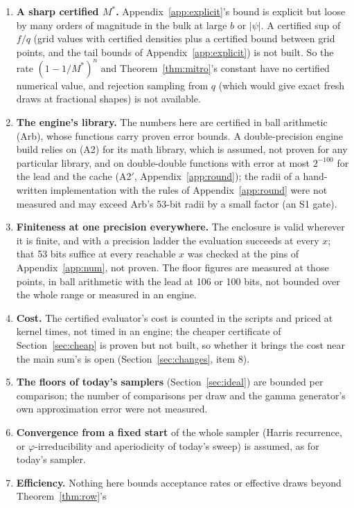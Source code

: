 \begin{enumerate}
\item \textbf{A sharp certified $M^*$.} Appendix~\ref{app:explicit}'s bound is explicit but loose by many orders of
magnitude in the bulk at large $b$ or $|\psi|$. A certified sup of $f/q$ (grid values with certified densities plus
a certified bound between grid points, and the tail bounds of Appendix~\ref{app:explicit}) is not built. So the
rate $(1-1/M^*)^n$ and Theorem~\ref{thm:mitro}'s constant have no certified numerical value, and rejection
sampling from $q$ (which would give exact fresh draws at fractional shapes) is not available.
\item \textbf{The engine's library.} The numbers here are certified in ball arithmetic (Arb), whose functions carry
proven error bounds. A double-precision engine build relies on (A2) for its math library, which is assumed, not
proven for any particular library, and on double-double functions with error at most $2^{-100}$ for the lead and
the cache (A2$'$, Appendix~\ref{app:round}); the radii of a hand-written implementation with the rules of
Appendix~\ref{app:round} were not measured and may exceed Arb's 53-bit radii by a small factor (an S1 gate).
\item \textbf{Finiteness at one precision everywhere.} The enclosure is valid wherever it is finite, and with a
precision ladder the evaluation succeeds at every $x$; that 53 bits suffice at every reachable $x$ was checked at
the pins of Appendix~\ref{app:num}, not proven. The floor figures are measured at those points, in ball
arithmetic with the lead at 106 or 100 bits, not bounded over the whole range or measured in an engine.
\item \textbf{Cost.} The certified evaluator's cost is counted in the scripts and priced at kernel times, not timed
in an engine; the cheaper certificate of Section~\ref{sec:cheap} is proven but not built, so whether it brings the
cost near the main sum's is open (Section~\ref{sec:changes}, item 8).
\item \textbf{The floors of today's samplers} (Section~\ref{sec:ideal}) are bounded per comparison; the number of
comparisons per draw and the gamma generator's own approximation error were not measured.
\item \textbf{Convergence from a fixed start} of the whole sampler (Harris recurrence, or $\varphi$-irreducibility
and aperiodicity of today's sweep) is assumed, as for today's sampler.
\item \textbf{Efficiency.} Nothing here bounds acceptance rates or effective draws beyond Theorem~\ref{thm:row}'s

\end{enumerate}
